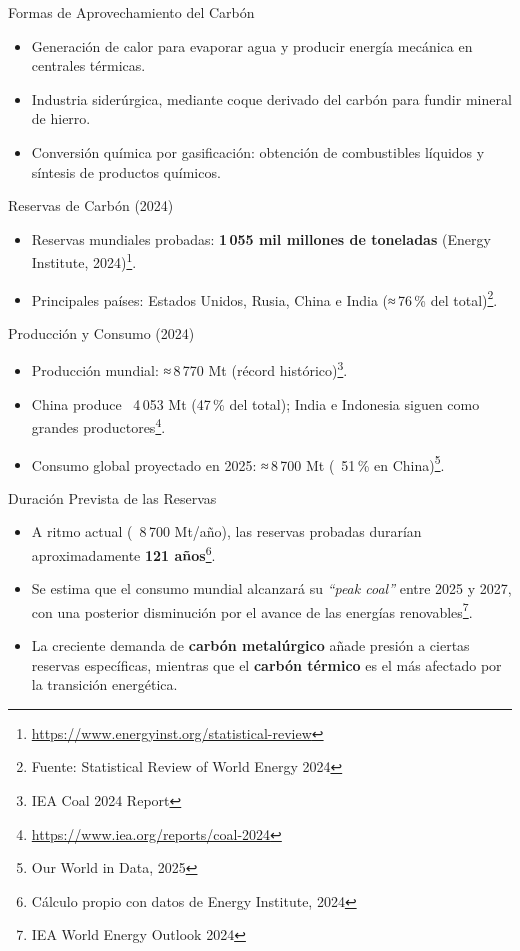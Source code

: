 \documentclass[main.tex]{subfiles}
\begin{document}
\begin{frame}{Formas de Aprovechamiento del Carbón}
    \begin{itemize}
        \item Generación de calor para evaporar agua y producir energía mecánica en centrales térmicas.
        \item Industria siderúrgica, mediante coque derivado del carbón para fundir mineral de hierro.
        \item Conversión química por gasificación: obtención de combustibles líquidos y síntesis de productos químicos.
    \end{itemize}
\end{frame}

\begin{frame}{Reservas de Carbón (2024)}
    \begin{itemize}
        \item Reservas mundiales probadas: \textbf{1\,055 mil millones de toneladas} (Energy Institute, 2024)\footnote{\url{https://www.energyinst.org/statistical-review}}.
        \item Principales países: Estados Unidos, Rusia, China e India (≈ 76\,\% del total)\footnote{Fuente: Statistical Review of World Energy 2024}.
    \end{itemize}
\end{frame}



\begin{frame}{Producción y Consumo (2024)}
    \begin{itemize}
        \item Producción mundial: ≈ 8\,770 Mt (récord histórico)\footnote{IEA Coal 2024 Report}.
        \item China produce ~4\,053 Mt (47\,\% del total); India e Indonesia siguen como grandes productores\footnote{\url{https://www.iea.org/reports/coal-2024}}.
        \item Consumo global proyectado en 2025: ≈ 8\,700 Mt (~51\,\% en China)\footnote{Our World in Data, 2025}.
    \end{itemize}
\end{frame}




\begin{frame}{Duración Prevista de las Reservas}
    \begin{itemize}
        \item A ritmo actual (~8\,700 Mt/año), las reservas probadas durarían aproximadamente \textbf{121 años}\footnote{Cálculo propio con datos de Energy Institute, 2024}.
        \item Se estima que el consumo mundial alcanzará su \textit{“peak coal”} entre 2025 y 2027, con una posterior disminución por el avance de las energías renovables\footnote{IEA World Energy Outlook 2024}.
        \item La creciente demanda de \textbf{carbón metalúrgico} añade presión a ciertas reservas específicas, mientras que el \textbf{carbón térmico} es el más afectado por la transición energética.
    \end{itemize}
\end{frame}
\end{document}
